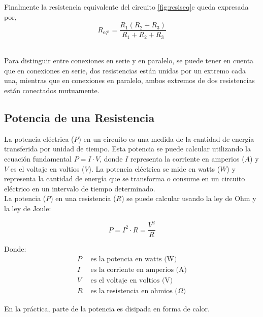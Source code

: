 \indent Finalmente la resistencia equivalente del circuito \ref{fig:resiseq}c queda expresada por,
\begin{equation*}
    R_{eq^2} = \frac{R_1(R_2 + R_3)}{R_1 + R_2 + R_3}
\end{equation*}
\\


\begin{remark}
   Para distinguir entre conexiones en serie y en paralelo, se puede tener en cuenta que en conexiones en serie, dos resistencias están unidas por un extremo cada una, mientras que en conexiones en paralelo, ambos extremos de dos resistencias están conectados mutuamente.
\end{remark}
 

\subsection{Potencia de una Resistencia}
La potencia eléctrica (\(P\)) en un circuito es una medida de la cantidad de energía transferida por unidad de tiempo. Esta potencia se puede calcular utilizando la ecuación fundamental \(P = I \cdot V\), donde \(I\) representa la corriente en amperios (\(A\)) y \(V\) es el voltaje en voltios (\(V\)). La potencia eléctrica se mide en watts (\(W\)) y representa la cantidad de energía que se transforma o consume en un circuito eléctrico en un intervalo de tiempo determinado. \\


 La potencia (\(P\)) en una resistencia (\(R\)) se puede calcular usando la ley de Ohm y la ley de Joule:

\begin{equation*}
P = I^2 \cdot R = \frac{V^2}{R}    
\end{equation*}


Donde:
\begin{align*}
    P &\text{ es la potencia en watts (W)} \\
    I &\text{ es la corriente en amperios (A)} \\
    V &\text{ es el voltaje en voltios (V)} \\
    R &\text{ es la resistencia en ohmios (\(\Omega\))}
\end{align*}

\begin{remark}
    En la práctica, parte de la potencia es disipada en forma de calor.
\end{remark}



